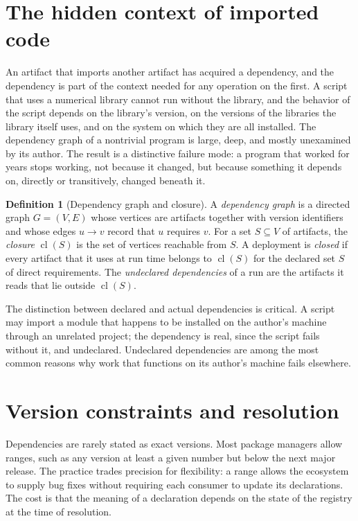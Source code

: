 \documentclass[11pt,twoside,openright]{book}
\theoremstyle{plain}
\theoremstyle{definition}
\newtheorem{definition}[theorem]{Definition}
\theoremstyle{remark}
\DeclareMathOperator{\Cl}{cl}
\begin{document}
\section{The hidden context of imported code}

An artifact that imports another artifact has acquired a dependency, and the dependency is part of the context needed for any operation on the first. A script that uses a numerical library cannot run without the library, and the behavior of the script depends on the library's version, on the versions of the libraries the library itself uses, and on the system on which they are all installed. The dependency graph of a nontrivial program is large, deep, and mostly unexamined by its author. The result is a distinctive failure mode: a program that worked for years stops working, not because it changed, but because something it depends on, directly or transitively, changed beneath it.

\begin{definition}[Dependency graph and closure]\label{def:depgraph}
A \emph{dependency graph} is a directed graph $G=(V,E)$ whose vertices are artifacts together with version identifiers and whose edges $u\to v$ record that $u$ requires $v$. For a set $S\subseteq V$ of artifacts, the \emph{closure} $\Cl(S)$ is the set of vertices reachable from $S$. A deployment is \emph{closed} if every artifact that it uses at run time belongs to $\Cl(S)$ for the declared set $S$ of direct requirements. The \emph{undeclared dependencies} of a run are the artifacts it reads that lie outside $\Cl(S)$.
\end{definition}

The distinction between declared and actual dependencies is critical. A script may import a module that happens to be installed on the author's machine through an unrelated project; the dependency is real, since the script fails without it, and undeclared. Undeclared dependencies are among the most common reasons why work that functions on its author's machine fails elsewhere.

\section{Version constraints and resolution}

Dependencies are rarely stated as exact versions. Most package managers allow ranges, such as any version at least a given number but below the next major release. The practice trades precision for flexibility: a range allows the ecosystem to supply bug fixes without requiring each consumer to update its declarations. The cost is that the meaning of a declaration depends on the state of the registry at the time of resolution.
\end{document}
